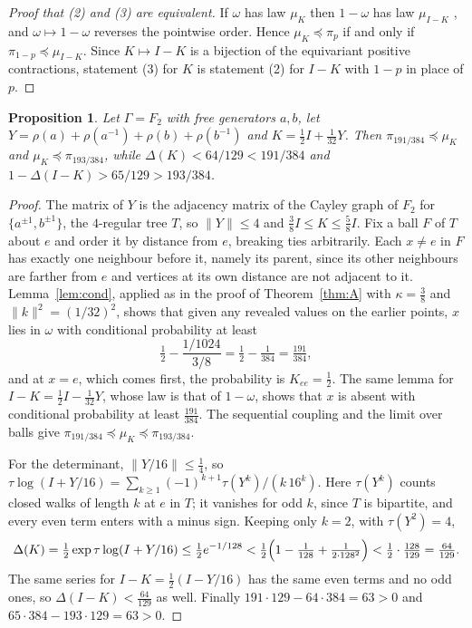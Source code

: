 \documentclass[11pt]{amsart}
\newtheorem{proposition}{Proposition}[section]
\theoremstyle{remark}
\theoremstyle{definition}
\newcommand{\Ga}{\Gamma}
\newcommand{\FK}{\Delta}
\newcommand{\tr}{\tau}
\newcommand{\dom}{\preccurlyeq}
\begin{document}
\begin{proof}[Proof that (2) and (3) are equivalent]
If $\omega$ has law $\mu_K$ then $1-\omega$ has law $\mu_{I-K}$ \cite{Ly03}, and $\omega\mapsto1-\omega$ reverses the
pointwise order. Hence $\mu_K\dom\pi_p$ if and only if $\pi_{1-p}\dom\mu_{I-K}$. Since $K\mapsto I-K$ is a
bijection of the equivariant positive contractions, statement (3) for $K$ is statement (2) for $I-K$ with $1-p$ in place
of $p$.
\end{proof}

\begin{proposition}\label{prop:F2}
Let $\Ga=F_2$ with free generators $a,b$, let $Y=\rho(a)+\rho(a^{-1})+\rho(b)+\rho(b^{-1})$ and
$K=\tfrac12 I+\tfrac1{32}Y$. Then $\pi_{191/384}\dom\mu_K$ and $\mu_K\dom\pi_{193/384}$, while
$\FK(K)<64/129<191/384$ and $1-\FK(I-K)>65/129>193/384$.
\end{proposition}

\begin{proof}
The matrix of $Y$ is the adjacency matrix of the Cayley graph of $F_2$ for $\{a^{\pm1},b^{\pm1}\}$, the $4$-regular
tree $T$, so $\|Y\|\le4$ and $\tfrac38I\le K\le\tfrac58I$. Fix a ball $F$ of $T$ about $e$ and order it by distance
from $e$, breaking ties arbitrarily. Each $x\ne e$ in $F$ has exactly one neighbour before it, namely its parent, since
its other neighbours are farther from $e$ and vertices at its own distance are not adjacent to it. Lemma~\ref{lem:cond},
applied as in the proof of Theorem~\ref{thm:A} with $\kappa=\tfrac38$ and $\|k\|^2=(1/32)^2$, shows that given any
revealed values on the earlier points, $x$ lies in $\omega$ with conditional probability at least
\[
\tfrac12-\frac{1/1024}{3/8}=\tfrac12-\tfrac1{384}=\tfrac{191}{384},
\]
and at $x=e$, which comes first, the probability is $K_{ee}=\tfrac12$. The same lemma for $I-K=\tfrac12I-\tfrac1{32}Y$, whose law is that of
$1-\omega$, shows that $x$ is absent with conditional probability at least $\tfrac{191}{384}$. The sequential coupling
\cite[Lemma~5.2]{LS03} and the limit over balls give $\pi_{191/384}\dom\mu_K\dom\pi_{193/384}$.

For the determinant, $\|Y/16\|\le\tfrac14$, so
$\tr\log(I+Y/16)=\sum_{k\ge1}(-1)^{k+1}\tr(Y^k)/(k\,16^k)$. Here $\tr(Y^k)$ counts closed walks of length $k$ at $e$
in $T$; it vanishes for odd $k$, since $T$ is bipartite, and every even term enters with a minus sign. Keeping only
$k=2$, with $\tr(Y^2)=4$,
\[
\FK(K)=\tfrac12\exp\tr\log(I+Y/16)\le\tfrac12e^{-1/128}<\tfrac12\Bigl(1-\tfrac1{128}+\tfrac1{2\cdot128^2}\Bigr)
<\tfrac12\cdot\tfrac{128}{129}=\tfrac{64}{129}.
\]
The same series for $I-K=\tfrac12(I-Y/16)$ has the same even terms and no odd ones, so $\FK(I-K)<\tfrac{64}{129}$ as
well. Finally $191\cdot129-64\cdot384=63>0$ and $65\cdot384-193\cdot129=63>0$.
\end{proof}
\end{document}
